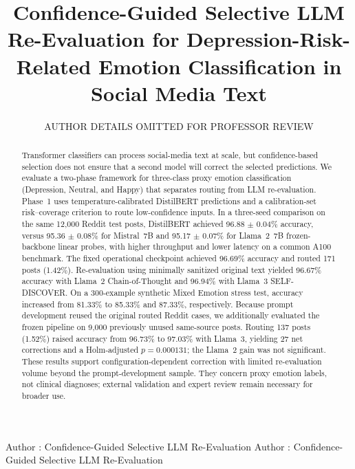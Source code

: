 \documentclass{ieeeaccess}
\begin{document}
\history{}
\doi{}

\title{Confidence-Guided Selective LLM Re-Evaluation for Depression-Risk-Related Emotion Classification in Social Media Text}
\author{\uppercase{Author Details Omitted for Professor Review}}
\address[1]{Affiliation details will be inserted in the submission version.}
\markboth
{Author \headeretal: Confidence-Guided Selective LLM Re-Evaluation}
{Author \headeretal: Confidence-Guided Selective LLM Re-Evaluation}

\begin{abstract}
Transformer classifiers can process social-media text at scale, but confidence-based selection does not ensure that a second model will correct the selected predictions. We evaluate a two-phase framework for three-class proxy emotion classification (Depression, Neutral, and Happy) that separates routing from LLM re-evaluation. Phase~1 uses temperature-calibrated DistilBERT predictions and a calibration-set risk--coverage criterion to route low-confidence inputs. In a three-seed comparison on the same 12,000 Reddit test posts, DistilBERT achieved 96.88 $\pm$ 0.04\% accuracy, versus 95.36 $\pm$ 0.08\% for Mistral~7B and 95.17 $\pm$ 0.07\% for Llama~2~7B frozen-backbone linear probes, with higher throughput and lower latency on a common A100 benchmark. The fixed operational checkpoint achieved 96.69\% accuracy and routed 171 posts (1.42\%). Re-evaluation using minimally sanitized original text yielded 96.67\% accuracy with Llama~2 Chain-of-Thought and 96.94\% with Llama~3 SELF-DISCOVER. On a 300-example synthetic Mixed Emotion stress test, accuracy increased from 81.33\% to 85.33\% and 87.33\%, respectively. Because prompt development reused the original routed Reddit cases, we additionally evaluated the frozen pipeline on 9,000 previously unused same-source posts. Routing 137 posts (1.52\%) raised accuracy from 96.73\% to 97.03\% with Llama~3, yielding 27 net corrections and a Holm-adjusted $p=0.000131$; the Llama~2 gain was not significant. These results support configuration-dependent correction with limited re-evaluation volume beyond the prompt-development sample. They concern proxy emotion labels, not clinical diagnoses; external validation and expert review remain necessary for broader use.
\end{abstract}
\end{document}
